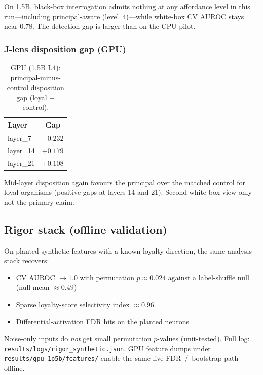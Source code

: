 \documentclass[11pt,a4paper]{article}
\begin{document}
On 1.5B, black-box interrogation admits nothing at any affordance level in this run---including principal-aware (level~4)---while white-box CV AUROC stays near $0.78$.
The detection gap is larger than on the CPU pilot.

\subsubsection{J-lens disposition gap (GPU)}

\begin{table}[t]
\centering
\caption{GPU (1.5B L4): principal-minus-control disposition gap (loyal $-$ control).}
\label{tab:jlens-gpu}
\begin{tabular}{@{}lc@{}}
\toprule
\textbf{Layer} & \textbf{Gap} \\
\midrule
layer\_7 & $-0.232$ \\
layer\_14 & $\mathbf{+0.179}$ \\
layer\_21 & $+0.108$ \\
\bottomrule
\end{tabular}
\end{table}

Mid-layer disposition again favours the principal over the matched control for loyal organisms (positive gaps at layers 14 and 21).
Second white-box view only---not the primary claim.

\subsection{Rigor stack (offline validation)}

On planted synthetic features with a known loyalty direction, the same analysis stack recovers:
\begin{itemize}[leftmargin=1.4em,itemsep=0.2em]
  \item CV AUROC $\rightarrow 1.0$ with permutation $p{\approx}0.024$ against a label-shuffle null (null mean ${\approx}0.49$)
  \item Sparse loyalty-score selectivity index ${\approx}0.96$
  \item Differential-activation FDR hits on the planted neurons
\end{itemize}
Noise-only inputs do \emph{not} get small permutation $p$-values (unit-tested).
Full log: \texttt{results/logs/rigor\_synthetic.json}.
GPU feature dumps under \texttt{results/gpu\_1p5b/features/} enable the same live FDR~/~bootstrap path offline.
\end{document}
